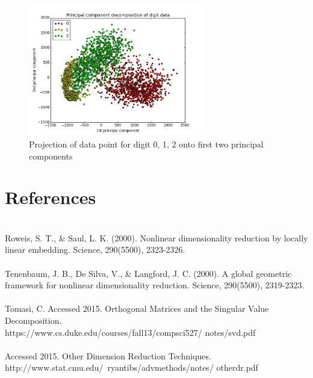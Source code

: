 \documentclass[11pt]{article}
\begin{document}
\begin{multicols}{2}
\begin{figure}[H]
\begin{center}
\includegraphics[width=3in]{pca_012.png}
\caption{Projection of data point for digit 0, 1, 2 onto first two principal components}
\label{pca_012}
\end{center}
\end{figure}


\section*{References}
\mbox{} \\
Roweis, S. T., \& Saul, L. K. (2000). Nonlinear dimensionality reduction by locally linear embedding. Science, 290(5500), 2323-2326. \\
\mbox{} \\
Tenenbaum, J. B., De Silva, V., \& Langford, J. C. (2000). A global geometric framework for nonlinear dimensionality reduction. Science, 290(5500), 2319-2323. \\
\mbox{} \\
Tomasi, C. Accessed 2015. Orthogonal Matrices and the Singular Value Decomposition.\\
https://www.cs.duke.edu/courses/fall13/compsci527/ notes/svd.pdf \\
\mbox{} \\
Accessed 2015. Other Dimension Reduction Techniques. \\
http://www.stat.cmu.edu/~ryantibs/advmethods/notes/ otherdr.pdf \\
\mbox{} \\


\end{multicols}
\end{document}
